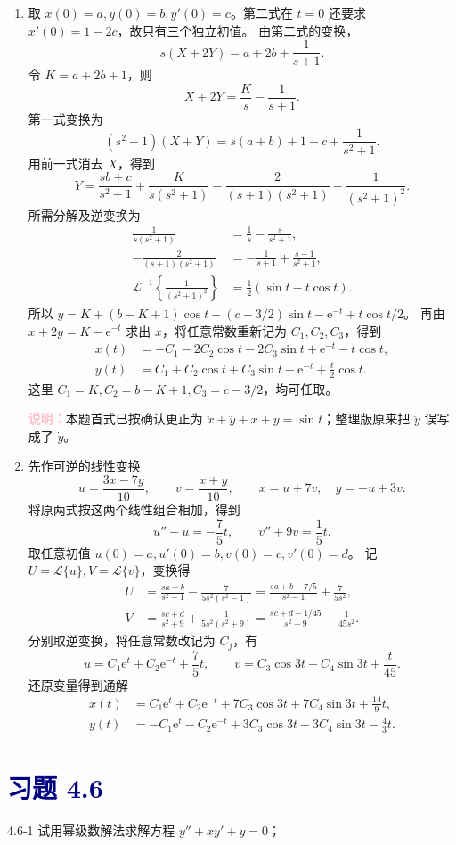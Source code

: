 \documentclass[UTF8,a4paper,11pt]{ctexart}
\newcommand{\e}{\mathrm e}
\newcommand{\note}[1]{\par\smallskip\noindent\textcolor{pink}{\bfseries 说明：}#1\par\smallskip}
\newcommand{\sect}[1]{\section*{\textcolor{navy}{习题 #1}}}
\begin{document}
\begin{solution}
\begin{enumerate}[label=(\arabic*)]
\item 取 $x(0)=a,y(0)=b,y'(0)=c$。第二式在 $t=0$ 还要求 $x'(0)=1-2c$，故只有三个独立初值。
由第二式的变换，
\[
s(X+2Y)=a+2b+\frac1{s+1}.
\]
令 $K=a+2b+1$，则
\[
X+2Y=\frac K s-\frac1{s+1}.
\]
第一式变换为
\[
(s^2+1)(X+Y)=s(a+b)+1-c+\frac1{s^2+1}.
\]
用前一式消去 $X$，得到
\[
Y=\frac{sb+c}{s^2+1}
+\frac{K}{s(s^2+1)}
-\frac2{(s+1)(s^2+1)}-\frac1{(s^2+1)^2}.
\]
所需分解及逆变换为
\[
\begin{aligned}
\frac1{s(s^2+1)}&=\frac1s-\frac{s}{s^2+1},\\
-\frac2{(s+1)(s^2+1)}&=-\frac1{s+1}+\frac{s-1}{s^2+1},\\
\mathcal L^{-1}\left\{\frac1{(s^2+1)^2}\right\}
&=\frac12(\sin t-t\cos t).
\end{aligned}
\]
所以 $y=K+(b-K+1)\cos t+(c-3/2)\sin t-\e^{-t}+t\cos t/2$。
再由 $x+2y=K-\e^{-t}$ 求出 $x$，将任意常数重新记为 $C_1,C_2,C_3$，得到
\[
\boxed{\begin{aligned}
x(t)&=-C_1-2C_2\cos t-2C_3\sin t+\e^{-t}-t\cos t,\\
y(t)&=C_1+C_2\cos t+C_3\sin t-\e^{-t}+\frac t2\cos t.
\end{aligned}}
\]
这里 $C_1=K,C_2=b-K+1,C_3=c-3/2$，均可任取。
\note{本题首式已按确认更正为 $\ddot x+\ddot y+x+y=\sin t$；整理版原来把 $\ddot y$ 误写成了 $\dot y$。}

\item 先作可逆的线性变换
\[
u=\frac{3x-7y}{10},\qquad v=\frac{x+y}{10},\qquad
x=u+7v,\quad y=-u+3v.
\]
将原两式按这两个线性组合相加，得到
\[
u''-u=-\frac75t,\qquad v''+9v=\frac15t.
\]
取任意初值 $u(0)=a,u'(0)=b,v(0)=c,v'(0)=d$。
记 $U=\mathcal L\{u\},V=\mathcal L\{v\}$，变换得
\[
\begin{aligned}
U&=\frac{sa+b}{s^2-1}-\frac7{5s^2(s^2-1)}
=\frac{sa+b-7/5}{s^2-1}+\frac7{5s^2},\\
V&=\frac{sc+d}{s^2+9}+\frac1{5s^2(s^2+9)}
=\frac{sc+d-1/45}{s^2+9}+\frac1{45s^2}.
\end{aligned}
\]
分别取逆变换，将任意常数改记为 $C_j$，有
\[
u=C_1\e^t+C_2\e^{-t}+\frac75t,\qquad
v=C_3\cos3t+C_4\sin3t+\frac{t}{45}.
\]
还原变量得到通解
\[
\boxed{\begin{aligned}
x(t)&=C_1\e^t+C_2\e^{-t}+7C_3\cos3t+7C_4\sin3t+\frac{14}{9}t,\\
y(t)&=-C_1\e^t-C_2\e^{-t}+3C_3\cos3t+3C_4\sin3t-\frac43t.
\end{aligned}}
\]
\end{enumerate}
\end{solution}

\sect{4.6}
\begin{problem}{4.6-1}
试用幂级数解法求解方程
$y''+xy'+y=0$；
\end{problem}
\end{document}
